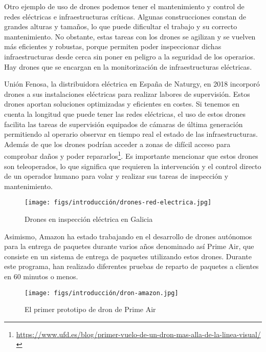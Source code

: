 Otro ejemplo de uso de drones podemos tener el mantenimiento y control de redes eléctricas e infraestructuras críticas. Algunas construcciones constan de grandes alturas y tamaños, lo que puede
dificultar el trabajo y su correcto mantenimiento. No obstante, estas tareas con los drones se agilizan y se vuelven más eficientes y robustas, porque permiten poder
inspeccionar dichas infraestructuras desde cerca sin poner en peligro a la seguridad de los operarios. 
Hay drones que se encargan en la monitorización de infraestructuras eléctricas. 

Unión Fenosa, la distribuidora eléctrica en España de Naturgy, en 2018 incorporó drones a sus instalaciones eléctricas para realizar labores de supervisión. Estos drones aportan 
soluciones optimizadas y eficientes en costes. Si tenemos en cuenta la longitud que puede tener las redes eléctricas, el uso de estos drones facilita las tareas de supervisión equipados de cámaras de última generación permitiendo al operario observar en tiempo real el estado de las infraestructuras. Además de que los
drones podrían acceder a zonas de difícil acceso para comprobar daños y poder repararlos\footnote{\url{https://www.ufd.es/blog/primer-vuelo-de-un-dron-mas-alla-de-la-linea-visual/}}.  
Es importante mencionar que estos drones son teleoperados, lo que significa que requieren la intervención y el control directo de un operador humano para volar y realizar sus tareas 
de inspección y mantenimiento.

\begin{figure} [H]
  \begin{center}
    \texttt{[image: figs/introducción/drones-red-electrica.jpg]}
  \end{center}
  \caption{Drones en inspección eléctrica en Galicia}
  \label{fig:Fenosa}
  \vspace{-1.5em}
\end{figure}

Asimismo, Amazon ha estado trabajando en el desarrollo de drones autónomos para la entrega de paquetes durante varios años denominado así Prime Air\cite{AmazonPrimeAir}, 
que consiste en un sistema de entrega de paquetes utilizando estos drones. Durante este programa, han realizado diferentes pruebas de reparto de paquetes a clientes
en 60 minutos o menos. 

\begin{figure} [H]
  \begin{center}
    \texttt{[image: figs/introducción/dron-amazon.jpg]}
  \end{center}
  \caption{El primer prototipo de dron de Prime Air}
  \label{fig:PrimerPrimeAir}
  \vspace{-1.5em}
\end{figure}


